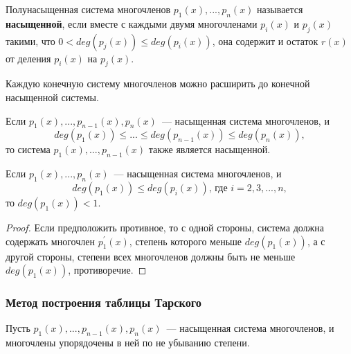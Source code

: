 \begin{definition}\cite{lect1}
    Полунасыщенная система многочленов $p_1(x), ... , p_n(x)$ называется \textbf{насыщенной}, если вместе с каждыми двумя многочленами $p_i(x)$ и $p_j(x)$ такими, что $0 < deg(p_j(x)) \leq deg(p_i(x))$, она содержит и остаток $r(x)$ от деления $p_i(x)$ на $p_j(x)$. 
\end{definition}

\begin{proposal}\cite{lect1}
    Каждую конечную систему многочленов можно расширить до конечной насыщенной системы.
\end{proposal}

\begin{proposal}\label{subsystem}\cite{lect1}
    Если $p_1(x), ... , p_{n-1}(x), p_n(x)$~--- насыщенная система многочленов, и 
    \begin{equation*}
        deg(p_1(x)) \leq ... \leq deg(p_{n-1}(x)) \leq deg(p_n(x)),
    \end{equation*}
    то система $p_1(x), ... , p_{n-1}(x)$ также является насыщенной.
\end{proposal}

\begin{proposal}\label{min deg}
    Если $p_1(x), ... , p_n(x)$~--- насыщенная система многочленов, и 
    \begin{equation*}
        deg(p_1(x)) \leq deg(p_i(x)),\,\text{где $i = 2, 3, ... , n$},
    \end{equation*}
    то $deg(p_1(x)) < 1$.
\end{proposal}
\begin{proof}
    Если предположить противное, то с одной стороны, система должна содержать многочлен $p_1^\prime(x)$, степень которого меньше $deg(p_1(x))$, а с другой стороны, степени всех многочленов должны быть не меньше $deg(p_1(x))$, противоречие.
\end{proof}

\subsubsection{Метод построения таблицы Тарского}

Пусть $p_1(x), ... , p_{n-1}(x), p_n(x)$~--- насыщенная система многочленов, и многочлены упорядочены в ней по не убыванию степени.

